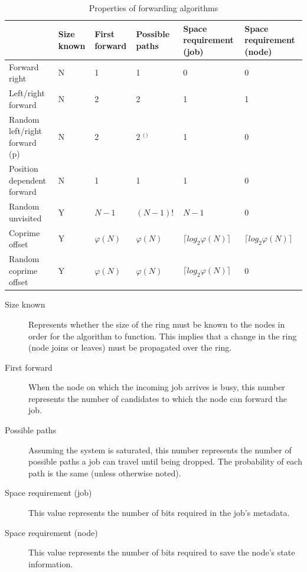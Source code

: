 \documentclass[10pt,a4paper]{article}
\begin{document}
\begin{table}[h!]
\hspace{-0.12\textwidth}
\begin{tabular}{|p{}|p{}|p{}|p{}|p{}|p{}|} \cline{2-6}
\multicolumn{1}{l|}{}		& Size known	& First forward	& Possible paths	& Space requirement (job)	& Space requirement (node) \\ \hline
Forward right				& N				& 1				& 1					& 0							& 0		\\ \hline
Left/right forward			& N				& 2				& 2					& 1							& 1		\\ \hline
Random left/right forward (p) & N			& 2				& 2 $^($\footnotemark$^)$ & 1					& 0		\\ \hline
Position dependent forward	& N				& 1				& 1					& 1							& 0		\\ \hline
Random unvisited			& Y				& $N-1$			& $(N-1)!$			& $N-1$	& 0		\\ \hline
Coprime offset				& Y				& $\varphi(N)$		& $\varphi(N)$ 		& $\lceil log_2 \varphi(N) \rceil$	& $\lceil log_2 \varphi(N) \rceil$ \\ \hline
Random coprime offset		& Y				& $\varphi(N)$		& $\varphi(N)$			& $\lceil log_2 \varphi(N) \rceil$	& 0		\\ \hline
\end{tabular}
\caption{Properties of forwarding algorithms}
\label{tabprops}
\end{table}

\begin{description}
\item[Size known] Represents whether the size of the ring must be known to the nodes in order for the algorithm to function. This implies that a change in the ring (node joins or leaves) must be propagated over the ring.
\item[First forward] When the node on which the incoming job arrives is busy, this number represents the number of candidates to which the node can forward the job.
\item[Possible paths] Assuming the system is saturated, this number represents the number of possible paths a job can travel until being dropped. The probability of each path is the same (unless otherwise noted).
\item[Space requirement (job)] This value represents the number of bits required in the job's metadata.
\item[Space requirement (node)] This value represents the number of bits required to save the node's state information.
\end{description}
\end{document}
